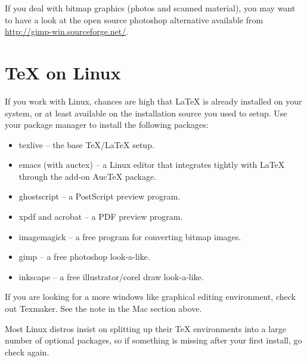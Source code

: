 If you deal with bitmap graphics (photos and scanned material), you may want
to have a look at the open source photoshop alternative  available
from \url{http://gimp-win.sourceforge.net/}.

\section{\TeX{} on Linux}

If you work with Linux, chances are high that \LaTeX{} is already installed
on your system, or at least available on the installation source you used to
setup. Use your package manager to install the following packages:

\begin{itemize}
\item texlive -- the base \TeX{}/\LaTeX{} setup.
\item emacs (with auctex) -- a Linux editor that integrates tightly with \LaTeX{} through the add-on AucTeX package.
\item ghostscript -- a PostScript preview program.
\item xpdf and acrobat -- a PDF preview program.
\item imagemagick -- a free program for converting bitmap images.
\item gimp -- a free photoshop look-a-like.
\item inkscape -- a free illustrator/corel draw look-a-like.
\end{itemize}

If you are looking for a more windows like graphical editing environment,
check out Texmaker. See the note in the Mac section above.

Most Linux distros insist on splitting up their \TeX{} environments into a
large number of optional packages, so if something is missing after your
first install, go check again.
